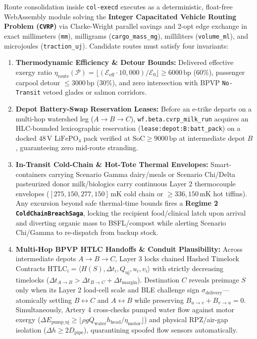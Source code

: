 Route consolidation inside \texttt{col-execd} executes as a deterministic, float-free
WebAssembly module solving the \textbf{Integer Capacitated Vehicle Routing Problem (\texttt{CVRP})}
via Clarke-Wright parallel savings and 2-opt edge exchange in exact millimeters (\texttt{mm}),
milligrams (\texttt{cargo\_mass\_mg}), milliliters (\texttt{volume\_ml}), and microjoules
(\texttt{traction\_uj}). Candidate routes must satisfy four invariants:
\begin{enumerate}
    \item \textbf{Thermodynamic Efficiency \& Detour Bounds:} Delivered effective exergy
    ratio $\eta_{\mathrm{route}}(\mathcal{P}) = \lfloor (\mathcal{E}_{\mathrm{eff}} \cdot 10{,}000) / \mathcal{E}_0 \rfloor \ge 6000\,\mathrm{bp}$
    ($60\%$), passenger carpool detour $\le 3000\,\mathrm{bp}$ ($30\%$), and zero intersection
    with BPVP \texttt{No-Transit} vetoed glades or salmon corridors.
    \item \textbf{Depot Battery-Swap Reservation Leases:} Before an e-trike departs on a
    multi-hop watershed leg ($A \to B \to C$), \texttt{wf.beta.cvrp\_milk\_run} acquires an
    HLC-bounded lexicographic reservation (\texttt{lease:depot:B:batt\_pack}) on a docked
    $48\,\mathrm{V}$ $\mathrm{LiFePO_4}$ pack verified at $\mathrm{SoC} \ge 9000\,\mathrm{bp}$
    at intermediate depot $B$, guaranteeing zero mid-route stranding.
    \item \textbf{In-Transit Cold-Chain \& Hot-Tote Thermal Envelopes:} Smart-containers
    carrying Scenario Gamma dairy/meals or Scenario Chi/Delta pasteurized donor milk/biologics
    carry continuous Layer 2 thermocouple envelopes ($[275{,}150, 277{,}150]\,\mathrm{mK}$
    cold chain or $\ge 336{,}150\,\mathrm{mK}$ hot tiffins). Any excursion beyond safe
    thermal-time bounds fires a \textbf{Regime 2 \texttt{ColdChainBreachSaga}}, locking the
    recipient food/clinical latch upon arrival and diverting organic mass to BSFL/compost
    while alerting Scenario Chi/Gamma to re-dispatch from backup stock.
    \item \textbf{Multi-Hop BPVP HTLC Handoffs \& Conduit Plausibility:} Across intermediate
    depots $A \to B \to C$, Layer 3 locks chained Hashed Timelock Contracts
    $\mathrm{HTLC}_i = \langle H(S), \Delta t_i, Q_{\mathrm{uj}}, u_i, v_i \rangle$ with
    strictly decreasing timelocks ($\Delta t_{A\to B} > \Delta t_{B\to C} + \Delta t_{\mathrm{margin}}$).
    Destination $C$ reveals preimage $S$ only when its Layer 2 load-cell scale and BLE
    challenge sign $\sigma_{\mathrm{delivery}}$---atomically settling $B \leftrightarrow C$
    and $A \leftrightarrow B$ while preserving $B_{u\to v} + B_{v\to u} = 0$. Simultaneously,
    Artery 4 cross-checks pumped water flow against motor exergy
    ($\Delta E_{\mathrm{pump\_uj}} \ge \lfloor \rho g Q_{\mathrm{water}} h_{\mathrm{head}} / \eta_{\mathrm{motor}} \rfloor$)
    and physical RPZ/air-gap isolation ($\Delta h \ge 2 D_{\mathrm{pipe}}$), quarantining
    spoofed flow sensors automatically.
\end{enumerate}

